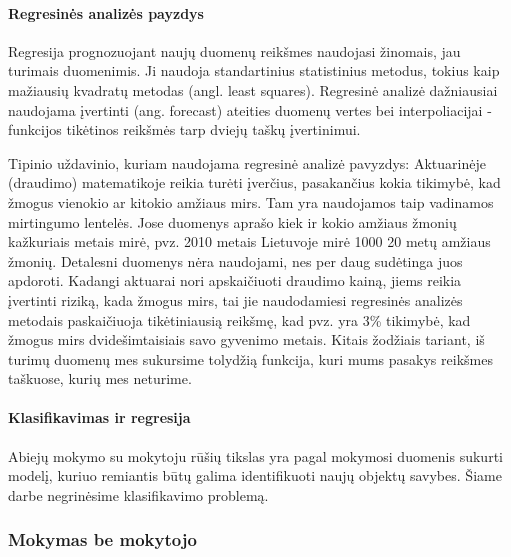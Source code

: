 \paragraph{Regresinės analizės payzdys}

Regresija prognozuojant naujų duomenų reikšmes naudojasi žinomais, jau turimais
duomenimis. Ji naudoja standartinius statistinius metodus, tokius kaip mažiausių
kvadratų metodas (angl. least squares). Regresinė analizė dažniausiai naudojama
įvertinti (ang. forecast) ateities duomenų vertes bei interpoliacijai -
funkcijos tikėtinos reikšmės tarp dviejų taškų įvertinimui.

Tipinio uždavinio, kuriam naudojama regresinė analizė pavyzdys: Aktuarinėje
(draudimo) matematikoje reikia turėti įverčius, pasakančius kokia tikimybė, kad
žmogus vienokio ar kitokio amžiaus mirs. Tam yra naudojamos taip vadinamos 
mirtingumo lentelės. Jose duomenys aprašo kiek ir kokio amžiaus žmonių
kažkuriais metais mirė, pvz. 2010 metais Lietuvoje mirė 1000 20 metų amžiaus 
žmonių. Detalesni duomenys nėra naudojami, nes per daug sudėtinga juos apdoroti.
Kadangi aktuarai nori apskaičiuoti draudimo kainą, jiems reikia įvertinti
riziką, kada žmogus mirs, tai jie naudodamiesi regresinės analizės metodais 
paskaičiuoja tikėtiniausią reikšmę, kad pvz. yra 3\% tikimybė, kad žmogus  mirs
dvidešimtaisiais savo gyvenimo metais. Kitais žodžiais tariant, iš turimų
duomenų mes sukursime tolydžią funkcija, kuri mums pasakys reikšmes taškuose,
kurių mes neturime.

\paragraph{Klasifikavimas ir regresija}

Abiejų mokymo su mokytoju rūšių tikslas yra pagal mokymosi duomenis sukurti
modelį, kuriuo remiantis būtų galima identifikuoti naujų objektų
savybes.\cite{markhall99} Šiame darbe negrinėsime klasifikavimo problemą.

\subsubsection{Mokymas be mokytojo}




